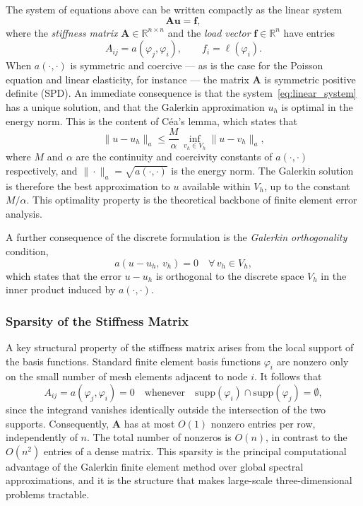 \documentclass[12pt]{article}
\theoremstyle{definition}
\theoremstyle{remark}
\begin{document}
The system of equations above can be written compactly as the linear system
\begin{equation}
    \mathbf{A}\mathbf{u} = \mathbf{f},
    \label{eq:linear_system}
\end{equation}
where the \emph{stiffness matrix} $\mathbf{A} \in \mathbb{R}^{n \times n}$ and
the \emph{load vector} $\mathbf{f} \in \mathbb{R}^n$ have entries
\begin{equation}
    A_{ij} = a(\varphi_j, \varphi_i), \qquad f_i = \ell(\varphi_i).
\end{equation}
When $a(\cdot, \cdot)$ is symmetric and coercive --- as is the case for the
Poisson equation and linear elasticity, for instance --- the matrix $\mathbf{A}$
is symmetric positive definite (SPD). An immediate consequence is that the
system~\eqref{eq:linear_system} has a unique solution, and that the Galerkin
approximation $u_h$ is optimal in the energy norm. This is the content of
C\'{e}a's lemma, which states that
\begin{equation}
    \|u - u_h\|_a \leq \frac{M}{\alpha}\, \inf_{v_h \in V_h} \|u - v_h\|_a,
\end{equation}
where $M$ and $\alpha$ are the continuity and coercivity constants of
$a(\cdot,\cdot)$ respectively, and $\|\cdot\|_a = \sqrt{a(\cdot,\cdot)}$ is
the energy norm. The Galerkin solution is therefore the best approximation
to $u$ available within $V_h$, up to the constant $M/\alpha$. This optimality
property is the theoretical backbone of finite element error analysis.

A further consequence of the discrete formulation is the \emph{Galerkin
orthogonality} condition,
\begin{equation}
    a(u - u_h,\, v_h) = 0 \quad \forall\, v_h \in V_h,
\end{equation}
which states that the error $u - u_h$ is orthogonal to the discrete space $V_h$
in the inner product induced by $a(\cdot,\cdot)$.

\subsubsection{Sparsity of the Stiffness Matrix}\label{sec:sparsity}

A key structural property of the stiffness matrix arises from the local support
of the basis functions. Standard finite element basis functions $\varphi_i$ are
nonzero only on the small number of mesh elements adjacent to node $i$. It
follows that
\begin{equation}
    A_{ij} = a(\varphi_j, \varphi_i) = 0
    \quad \text{whenever} \quad
    \mathrm{supp}(\varphi_i) \cap \mathrm{supp}(\varphi_j) = \emptyset,
\end{equation}
since the integrand vanishes identically outside the intersection of the two
supports. Consequently, $\mathbf{A}$ has at most $O(1)$ nonzero entries per row,
independently of $n$. The total number of nonzeros is $O(n)$, in contrast to
the $O(n^2)$ entries of a dense matrix. This sparsity is the principal
computational advantage of the Galerkin finite element method over global
spectral approximations, and it is the structure that makes large-scale
three-dimensional problems tractable.
\end{document}
